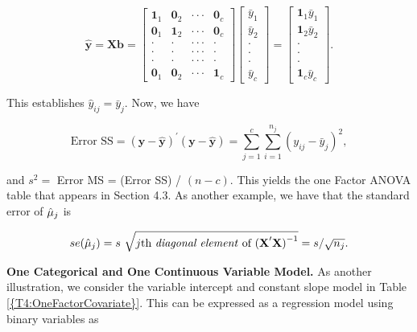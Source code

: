 \begin{center}
\[
\mathbf{\hat{y}}=\mathbf{Xb}=
\begin{bmatrix}
\mathbf{1}_1 & \mathbf{0}_2 & \cdot \cdot \cdot  & \mathbf{0}_c \\
\mathbf{0}_1 & \mathbf{1}_2 & \cdot \cdot \cdot  & \mathbf{0}_c \\
\cdot  & \cdot  & \cdot \cdot \cdot  & \cdot  \\
\cdot  & \cdot  & \cdot \cdot \cdot  & \cdot  \\
\cdot  & \cdot  & \cdot \cdot \cdot  & \cdot  \\
\mathbf{0}_1 & \mathbf{0}_2 & \cdot \cdot \cdot  & \mathbf{1}_c%
\end{bmatrix}
\begin{bmatrix}
\bar{y}_1 \\
\bar{y}_2 \\
\cdot  \\
\cdot  \\
\cdot  \\
\bar{y}_{c}%
\end{bmatrix}%
=%
\begin{bmatrix}
\mathbf{1}_1\bar{y}_1 \\
\mathbf{1}_2\bar{y}_2 \\
\cdot  \\
\cdot  \\
\cdot  \\
\mathbf{1}_{c}\bar{y}_{c}%
\end{bmatrix}%
.
\]
\end{center}

\noindent This establishes $\hat{y}_{ij}=\bar{y}_{j}$. Now, we have

\begin{center}
\[
\text{Error SS}=\mathbf{(y-\hat{y})^{\prime }(y-\hat{y})}=\sum_{j=1}^{c}%
\sum_{i=1}^{n_{j}}(y_{ij}-\bar{y}_{j})^{2},
\]
\end{center}

\noindent and $s^{2}=$ Error MS = (Error SS) / $(n-c)$. This yields
the one Factor ANOVA table that appears in Section 4.3. As
another example, we have that the standard error of $\hat{%
\mu}_{j}$ is

\begin{center}
\[
se(\hat{\mu}_{j})=s ~ \sqrt{j\text{th \textit{diagonal element} of }\mathbf{(X}%
^{\prime }\mathbf{X)}^{-1}}=s/\sqrt{n_{j}}.
\]
\end{center}

\textbf{One Categorical and One Continuous Variable Model.} As
another illustration, we consider the variable intercept and
constant slope model in Table \ref{{T4:OneFactorCovariate}}. This
can be expressed as a regression model using binary variables as

